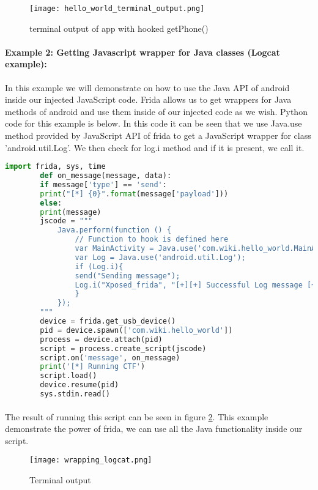 \documentclass[../main.tex]{subfile}
\begin{document}
\begin{figure}
	\texttt{[image: hello\_world\_terminal\_output.png]}
	\caption{terminal output of app with hooked getPhone()}
	\label{fig:hello_world_terminal_hooked}
\end{figure}
	
	
	
	\paragraph{Example 2: Getting Javascript wrapper for Java classes (Logcat example):} In this example we will demonstrate on how to use the Java API of android inside our injected JavaScript code. Frida allows us to get wrappers for Java methods of android and use them inside of our injected code as we wish. Python code for this example is below. In this code it can be seen that we use Java.use method provided by JavaScript API of frida to get a JavaScript wrapper for class 'android.util.Log'. We then check for log.i method and if it is present, we call it.
	\begin{lstlisting}[language=python]
		import frida, sys, time
		def on_message(message, data):
		if message['type'] == 'send':
		print("[*] {0}".format(message['payload']))
		else:
		print(message)
		jscode = """
			Java.perform(function () {
				// Function to hook is defined here
				var MainActivity = Java.use('com.wiki.hello_world.MainActivity');
				var Log = Java.use('android.util.Log');
				if (Log.i){
				send("Sending message");
				Log.i("Xposed_frida", "[+][+] Successful Log message [+][+]");
				}
			});
		"""
		device = frida.get_usb_device()
		pid = device.spawn(['com.wiki.hello_world'])
		process = device.attach(pid)
		script = process.create_script(jscode)
		script.on('message', on_message)
		print('[*] Running CTF')
		script.load()
		device.resume(pid)
		sys.stdin.read()
	\end{lstlisting}
	
	\paragraph{} The result of running this script can be seen in figure \ref{fig:wrapping_logcat}. This example demonstrate the power of frida, we can use all the Java functionality inside our script.
	\begin{figure}
		\texttt{[image: wrapping\_logcat.png]}
		\caption{Terminal output }
		\label{fig:wrapping_logcat}
	\end{figure}
	
\end{document}
